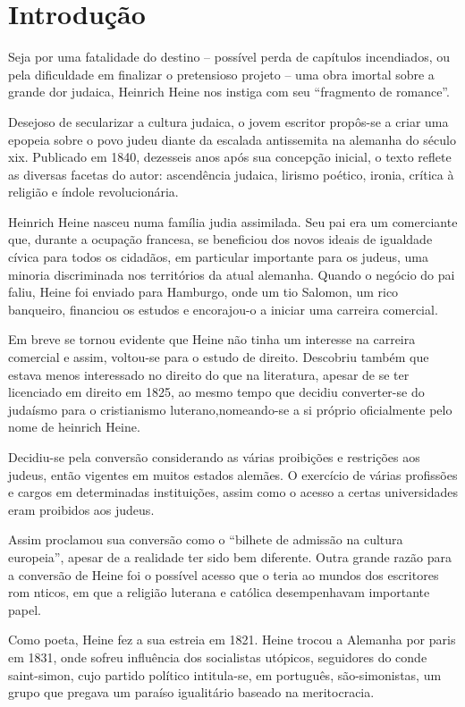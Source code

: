 \documentclass[12pt]{extarticle}
\begin{document}
\tableofcontents

\section{Introdução}

Seja por uma fatalidade do destino – possível perda de capítulos incendiados, ou pela dificuldade em finalizar o pretensioso projeto – uma obra imortal sobre a grande dor judaica, Heinrich Heine nos instiga com seu “fragmento de romance”.

Desejoso de secularizar a cultura judaica, o jovem escritor propôs-se a criar uma epopeia sobre o povo judeu diante da escalada antissemita na alemanha do século xix.
Publicado em 1840, dezesseis anos após sua concepção inicial, o texto reflete as diversas facetas do autor:
ascendência judaica, lirismo poético, ironia, crítica à religião e índole revolucionária.

Heinrich Heine nasceu numa família judia assimilada. Seu pai era um comerciante que, durante a ocupação francesa, se beneficiou dos novos ideais de igualdade cívica para todos os cidadãos, em particular importante para os judeus, uma minoria discriminada nos territórios da atual alemanha. 
Quando o negócio do pai faliu, Heine foi enviado para Hamburgo, onde um tio Salomon, um rico banqueiro, financiou os estudos e encorajou-o a iniciar uma carreira comercial.

Em breve se tornou evidente que Heine não tinha um interesse na carreira comercial e assim, voltou-se para o estudo de direito. 
Descobriu também que estava menos interessado no direito do que na literatura, apesar de se ter licenciado em direito em 1825, ao mesmo tempo que decidiu converter-se do judaísmo para o cristianismo luterano,nomeando-se a si próprio oficialmente pelo nome de heinrich Heine.

Decidiu-se pela conversão considerando as várias proibições e restrições aos judeus, então vigentes em muitos estados alemães. O exercício de várias profissões e cargos em determinadas instituições, assim como o acesso a certas universidades eram proibidos aos judeus. 

Assim proclamou sua conversão como o ``bilhete de admissão na cultura europeia'', apesar de a realidade ter sido bem diferente. Outra grande razão para a conversão de Heine foi o possível acesso que o teria ao mundos dos escritores rom nticos, em que a religião luterana e católica desempenhavam importante papel.

Como poeta, Heine fez a sua estreia em 1821. Heine trocou a Alemanha por paris em 1831, onde sofreu influência dos socialistas utópicos, seguidores do conde saint-simon, cujo partido político intitula-se, em português, são-simonistas, um grupo que pregava um paraíso igualitário baseado na meritocracia.
\end{document}
